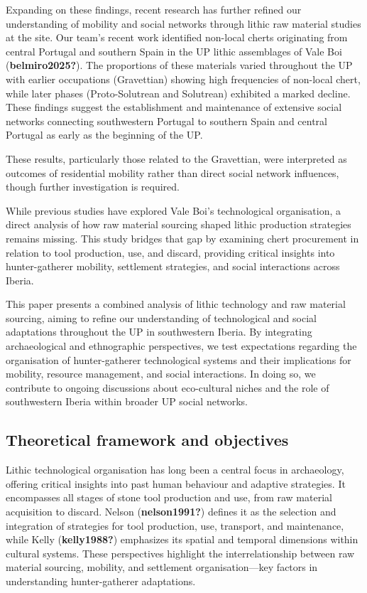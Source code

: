 \documentclass[
  a4paper,
  DIV=11,
  numbers=noendperiod]{scrreprt}
\begin{document}
Expanding on these findings, recent research has further refined our
understanding of mobility and social networks through lithic raw
material studies at the site. Our team's recent work identified
non-local cherts originating from central Portugal and southern Spain in
the UP lithic assemblages of Vale Boi (\textbf{belmiro2025?}). The
proportions of these materials varied throughout the UP with earlier
occupations (Gravettian) showing high frequencies of non-local chert,
while later phases (Proto-Solutrean and Solutrean) exhibited a marked
decline. These findings suggest the establishment and maintenance of
extensive social networks connecting southwestern Portugal to southern
Spain and central Portugal as early as the beginning of the UP.

These results, particularly those related to the Gravettian, were
interpreted as outcomes of residential mobility rather than direct
social network influences, though further investigation is required.

While previous studies have explored Vale Boi's technological
organisation, a direct analysis of how raw material sourcing shaped
lithic production strategies remains missing. This study bridges that
gap by examining chert procurement in relation to tool production, use,
and discard, providing critical insights into hunter-gatherer mobility,
settlement strategies, and social interactions across Iberia.

This paper presents a combined analysis of lithic technology and raw
material sourcing, aiming to refine our understanding of technological
and social adaptations throughout the UP in southwestern Iberia. By
integrating archaeological and ethnographic perspectives, we test
expectations regarding the organisation of hunter-gatherer technological
systems and their implications for mobility, resource management, and
social interactions. In doing so, we contribute to ongoing discussions
about eco-cultural niches and the role of southwestern Iberia within
broader UP social networks.

\subsection{Theoretical framework and
objectives}\label{theoretical-framework-and-objectives}

Lithic technological organisation has long been a central focus in
archaeology, offering critical insights into past human behaviour and
adaptive strategies. It encompasses all stages of stone tool production
and use, from raw material acquisition to discard. Nelson
(\textbf{nelson1991?}) defines it as the selection and integration of
strategies for tool production, use, transport, and maintenance, while
Kelly (\textbf{kelly1988?}) emphasizes its spatial and temporal
dimensions within cultural systems. These perspectives highlight the
interrelationship between raw material sourcing, mobility, and
settlement organisation---key factors in understanding hunter-gatherer
adaptations.
\end{document}
